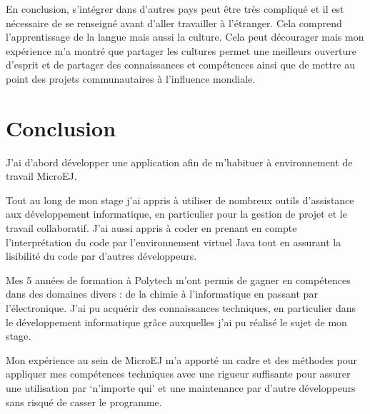 \documentclass[french,a4paper,12pt]{report}
\begin{document}
En conclusion, s’intégrer dans d'autres pays peut être très compliqué et il est nécessaire de se renseigné avant d'aller travailler à l'étranger. Cela comprend l'apprentissage de la langue mais aussi la culture. Cela peut décourager mais mon expérience m'a montré que partager les cultures permet une meilleurs ouverture d'esprit et de partager des connaissances et compétences ainsi que de mettre au point des projets communautaires à l'influence mondiale.

\chapter{Conclusion}

J'ai d'abord développer une application afin de m'habituer à environnement de travail MicroEJ.

Tout au long de mon stage j’ai appris à utiliser de nombreux outils d’assistance aux développement informatique, en particulier pour la gestion de projet et le travail collaboratif. J'ai aussi appris à coder en prenant en compte l’interprétation du code par l'environnement virtuel Java tout en assurant la lisibilité du code par d'autres développeurs.

Mes 5 années de formation à Polytech m’ont permis de gagner en compétences dans des domaines divers : de la chimie à l’informatique en passant par l’électronique. J’ai pu acquérir des connaissances techniques, en particulier dans le développement informatique grâce auxquelles j'ai pu réalisé le sujet de mon stage.

Mon expérience au sein de MicroEJ m’a apporté un cadre et des méthodes pour appliquer mes compétences techniques avec une rigueur suffisante pour assurer une utilisation par ‘n’importe qui’ et une maintenance par d’autre développeurs sans risqué de casser le programme.
\end{document}
